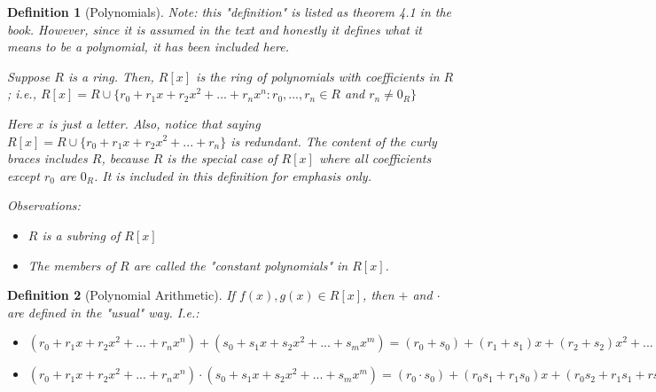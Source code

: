 \documentclass{article}
\theoremstyle{break}
\newtheorem{definition}{Definition}[subsection]
\begin{document}
\begin{definition}[Polynomials]
  \textit{Note: this "definition" is listed as theorem 4.1 in the book. 
  However, since it is assumed in the text and honestly it defines what it
  means to be a polynomial, it has been included here.}

  Suppose $R$ is a ring. Then, $R[x]$ is the ring of polynomials with
  coefficients in $R$; i.e., $R[x] = R \cup \{r_0 + r_1 x + r_2 x^2 + ... + r_n
  x^n : r_0, ..., r_n \in R$ and $r_n \neq 0_R \}$

  Here $x$ is just a letter. Also, notice that saying $R[x] = R \cup \{ r_0 +
  r_1 x + r_2 x^2 + ... + r_n \}$ is redundant. The content of the curly
  braces includes $R$, because $R$ is the special case of $R[x]$ where all
  coefficients except $r_0$ are $0_R$. It is included in this definition for
  emphasis only.

  Observations:
  \begin{itemize}
    \item $R$ is a subring of $R[x]$
    \item The members of $R$ are called the "constant polynomials" in $R[x]$. 
  \end{itemize}
\end{definition}

\begin{definition}[Polynomial Arithmetic]
  If $f(x), g(x) \in R[x]$, then $+$ and $\cdot$ are defined in the "usual"
  way. I.e.:

  \begin{itemize}
    \item $(r_0 + r_1x + r_2x^2 + ... + r_nx^n) + (s_0 + s_1x + s_2x^2 + ... +
    s_mx^m) = (r_0 + s_0) + (r_1 + s_1)x + (r_2 + s_2)x^2 + ...$
    \item $(r_0 + r_1x + r_2x^2 + ... + r_nx^n) \cdot (s_0 + s_1x + s_2x^2 +
    ... + s_mx^m) = (r_0 \cdot s_0) + (r_0s_1 + r_1s_0)x + (r_0s_2 + r_1s_1 +rs_0
    +r_2s_0 s_2)x^2 + ...$
  \end{itemize}
\end{definition}
\end{document}
